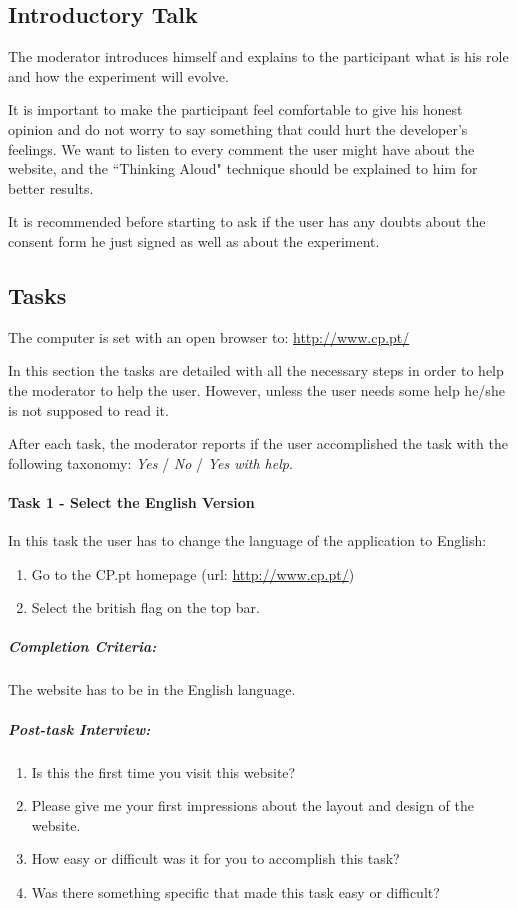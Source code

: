 \documentclass[a4paper]{article}
\begin{document}
\subsection{Introductory Talk}

The moderator introduces himself and explains to the participant what is his role and how the experiment will evolve.

It is important to make the participant feel comfortable to give his honest opinion and do not worry to say something that could hurt the developer's feelings. We want to listen to every comment the user might have about the website, and the ``Thinking Aloud" technique should be explained to him for better results.

It is recommended before starting to ask if the user has any doubts about the consent form he just signed as well as about the experiment.
 
\subsection{Tasks}

The computer is set with an open browser to: \url{http://www.cp.pt/}

In this section the tasks are detailed with all the necessary steps in order to help the moderator to help the user. However, unless the user needs some help he/she is not supposed to read it.

After each task, the moderator reports if the user accomplished the task with the following taxonomy: \emph{Yes} / \emph{No} / \emph{Yes with help}.

\paragraph{Task 1 - Select the English Version} In this task the user has to change the language of the application to English:

\begin{enumerate}[label=\roman*.]
  \item Go to the CP.pt homepage (url: \url{http://www.cp.pt/}) 
  \item Select the british flag on the top bar.
\end{enumerate}
\subparagraph{Completion Criteria:} The website has to be in the English language.

\subparagraph{Post-task Interview:}

\begin{enumerate}[label=1.\theenumi .]
  \item Is this the first time you visit this website?
  \item Please give me your first impressions about the layout and design of the website.
  \item How easy or difficult was it for you to accomplish this task?
  \item Was there something specific that made this task easy or difficult?
\end{enumerate}
\end{document}
